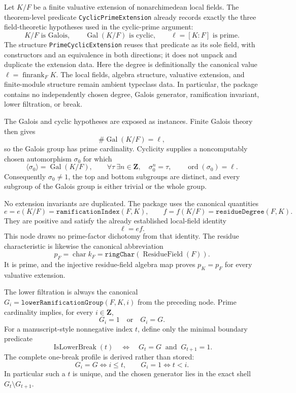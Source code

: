 \begin{definition}\label{mod:ramification-primecyclicextension}
Let $K/F$ be a finite valuative extension of nonarchimedean local fields.
The theorem-level predicate \texttt{CyclicPrimeExtension} already records
exactly the three field-theoretic hypotheses used in the cyclic-prime
argument:
\[
 K/F\text{ is Galois},\qquad
 \operatorname{Gal}(K/F)\text{ is cyclic},\qquad
 \ell=[K:F]\text{ is prime}.
\]
The structure \texttt{PrimeCyclicExtension} reuses that predicate as its
sole field, with constructors and an equivalence in both directions; it
does not unpack and duplicate the extension data.  Here the degree is
definitionally the canonical value
$\ell=\operatorname{finrank}_F K$.  The local fields, algebra structure,
valuative extension, and finite-module structure remain ambient typeclass
data.  In particular, the package contains no independently chosen degree,
Galois generator, ramification invariant, lower filtration, or break.

The Galois and cyclic hypotheses are exposed as instances.  Finite Galois theory
then gives
\[
 \#\operatorname{Gal}(K/F)=\ell,
\]
so the Galois group has prime cardinality.  Cyclicity supplies a
noncomputably chosen automorphism $\sigma_0$ for which
\[
 \langle\sigma_0\rangle=\operatorname{Gal}(K/F),\qquad
 \forall\tau\ \exists n\in\mathbf Z,\quad \sigma_0^n=\tau,
 \qquad \operatorname{ord}(\sigma_0)=\ell.
\]
Consequently $\sigma_0\ne1$, the top and bottom subgroups are distinct,
and every subgroup of the Galois group is either trivial or the whole group.

No extension invariants are duplicated.  The package uses the canonical
quantities
\[
 e=e(K/F)=\texttt{ramificationIndex}(F,K),\qquad
 f=f(K/F)=\texttt{residueDegree}(F,K).
\]
They are positive and satisfy the already established local-field identity
\[
 \ell=ef.
\]
This node draws no prime-factor dichotomy from that identity.  The residue
characteristic is likewise the canonical abbreviation
\[
 p_F=\operatorname{char}k_F
     =\texttt{ringChar}(\operatorname{ResidueField}(F)).
\]
It is prime, and the injective residue-field algebra map proves
$p_K=p_F$ for every valuative extension.

The lower filtration is always the canonical
$G_i=\texttt{lowerRamificationGroup}(F,K,i)$ from the preceding node.
Prime cardinality implies, for every $i\in\mathbf Z$,
\[
 G_i=1\quad\text{or}\quad G_i=G.
\]
For a manuscript-style nonnegative index $t$, define only the minimal
boundary predicate
\[
 \operatorname{IsLowerBreak}(t)
 \quad\Longleftrightarrow\quad
 G_t=G\ \text{ and }\ G_{t+1}=1.
\]
The complete one-break profile is derived rather than stored:
\[
 G_i=G\Longleftrightarrow i\le t,
 \qquad
 G_i=1\Longleftrightarrow t<i.
\]
In particular such a $t$ is unique, and the chosen generator lies in the
exact shell $G_t\setminus G_{t+1}$.


\end{definition}
